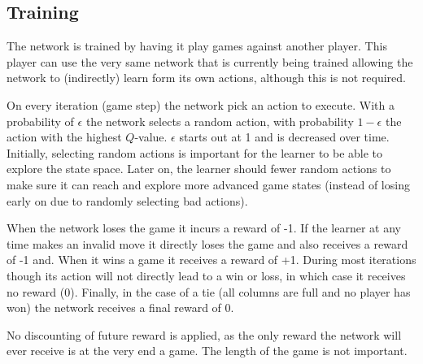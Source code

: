 \subsection{Training}
The network is trained by having it play games against another player. This player can use the very same network that is currently being trained allowing the network to (indirectly) learn form its own actions, although this is not required.

On every iteration (game step) the network pick an action to execute. With a probability of $\epsilon$ the network selects a random action, with probability $1 - \epsilon$ the action with the highest $Q$-value. $\epsilon$ starts out at 1 and is decreased over time. Initially, selecting random actions is important for the learner to be able to explore the state space. Later on, the learner should fewer random actions to make sure it can reach and explore more advanced game states (instead of losing early on due to randomly selecting bad actions).

When the network loses the game it incurs a reward of -1. If the learner at any time makes an invalid move it directly loses the game and also receives a reward of -1 and. When it wins a game it receives a reward of +1. During most iterations though its action will not directly lead to a win or loss, in which case it receives no reward (0). Finally, in the case of a tie (all columns are full and no player has won) the network receives a final reward of 0.

No discounting of future reward is applied, as the only reward the network will ever receive is at the very end a game. The length of the game is not important.